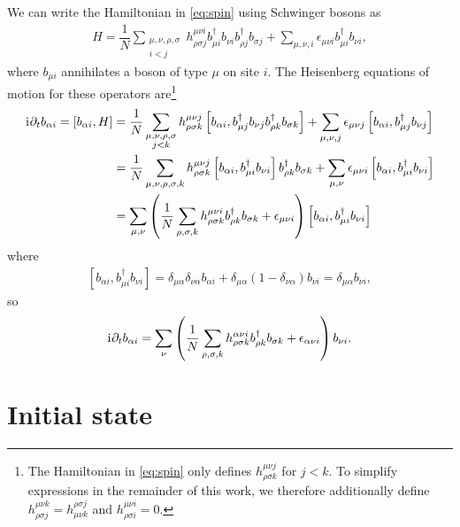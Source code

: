 \documentclass[nofootinbib,notitlepage,11pt]{revtex4-2}
\newcommand{\f}[2]{\dfrac{#1}{#2}} %
\newcommand{\p}[1]{\left(#1\right)} %
\renewcommand{\sp}[1]{\left[#1\right]} %
\renewcommand{\d}{\partial} %
\renewcommand{\i}{\mathrm{i}\mkern1mu} %
\newcommand{\1}{\mathds{1}}
\begin{document}
We can write the Hamiltonian in \eqref{eq:spin} using Schwinger bosons
as
\begin{align}
  H = \f1N \sum_{\substack{\mu,\nu,\rho,\sigma\\i<j}}
  h^{\mu\nu i}_{\rho\sigma j}
  b_{\mu i}^\dag b_{\nu i} b_{\rho j}^\dag b_{\sigma j}
  + \sum_{\mu,\nu,i} \epsilon_{\mu\nu i} b_{\mu i}^\dag b_{\nu i},
\end{align}
where $b_{\mu i}$ annihilates a boson of type $\mu$ on site $i$.  The
Heisenberg equations of motion for these operators are\footnote{The
  Hamiltonian in \eqref{eq:spin} only defines
  $h^{\mu\nu j}_{\rho\sigma k}$ for $j<k$.  To simplify expressions in
  the remainder of this work, we therefore additionally define
  $h^{\mu\nu k}_{\rho\sigma j}=h^{\rho\sigma j}_{\mu\nu k}$ and
  $h^{\mu\nu i}_{\rho\sigma i}=0$.}
\begin{align}
  \i \d_t b_{\alpha i} = \sp{b_{\alpha i}, H}
  &= \f1N \sum_{\substack{\mu,\nu,\rho,\sigma\\j<k}}
  h^{\mu\nu j}_{\rho\sigma k}
  \sp{b_{\alpha i}, b_{\mu j}^\dag b_{\nu j} b_{\rho k}^\dag b_{\sigma k}}
  + \sum_{\mu,\nu,j} \epsilon_{\mu\nu j}
  \sp{b_{\alpha i}, b_{\mu j}^\dag b_{\nu j}} \\
  &= \f1N \sum_{\mu,\nu,\rho,\sigma,k}
  h^{\mu\nu j}_{\rho\sigma k}
  \sp{b_{\alpha i}, b_{\mu i}^\dag b_{\nu i}} b_{\rho k}^\dag b_{\sigma k}
  + \sum_{\mu,\nu} \epsilon_{\mu\nu i}
  \sp{b_{\alpha i}, b_{\mu i}^\dag b_{\nu i}} \\
  &= \sum_{\mu,\nu} \p{\f1N \sum_{\rho,\sigma,k}
    h^{\mu\nu i}_{\rho\sigma k} b_{\rho k}^\dag b_{\sigma k}
    + \epsilon_{\mu\nu i}}
  \sp{b_{\alpha i}, b_{\mu i}^\dag b_{\nu i}}
\end{align}
where
\begin{align}
  \sp{b_{\alpha i}, b_{\mu i}^\dag b_{\nu i}}
  = \delta_{\mu\alpha} \delta_{\nu\alpha} b_{\alpha i}
  + \delta_{\mu\alpha} \p{1-\delta_{\nu\alpha}} b_{\nu i}
  = \delta_{\mu\alpha} b_{\nu i},
\end{align}
so
\begin{align}
  \i \d_t b_{\alpha i}
  = \sum_\nu \p{\f1N \sum_{\rho,\sigma,k}
    h^{\alpha\nu i}_{\rho\sigma k} b_{\rho k}^\dag b_{\sigma k}
    + \epsilon_{\alpha\nu i}} b_{\nu i}.
\end{align}

\section{Initial state}
\end{document}
